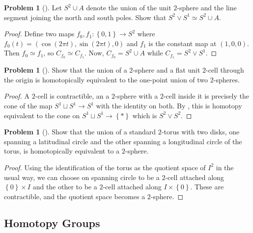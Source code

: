 \documentclass[reqno]{amsart}
\theoremstyle{definition}
\newtheorem{problem}[theorem]{Problem}
\theoremstyle{remark}
\begin{document}
\begin{problem}[]
    \cite[Ex 14.1]{Bredon} Let $S^2 \cup A$ denote the
    union of the unit $2$-sphere and the line segment
    joining the north and south poles. Show that
    $S^2 \vee S^{1} \simeq
    S^2 \cup A$.
\end{problem}

\begin{proof}
    Define two maps
    $f_0,f_1 \colon \left\{ 0,1 \right\}  \to 
    S^2$ where
    $f_0 (t) = \left( \cos (2\pi t), \sin(2\pi t), 0 \right) $ 
    and $f_1$ is the constant map at $(1,0,0)$. Then
    $f_0 \simeq f_1$, so $C_{f_0} \simeq C_{f_1}$. Now,
    $C_{f_0} = S^2 \cup  A$ while
    $C_{f_1} = S^2 \vee S^{1}$.
\end{proof}

\begin{problem}[]
    \cite[Ex 14.2]{Bredon} 
    Show that the union of a $2$-sphere and a flat
    unit  $2$-cell through the origin is homotopically
    equivalent to the one-point union of two $2$-spheres.
\end{problem}

\begin{proof}
    A $2$-cell is contractible, an
    a $2$-sphere with a $2$-cell inside it is precisely the
    cone of the map
    $S^1 \sqcup S^1 \to S^1$ with the identity on both.
    By \cite[Thm 14.19]{Bredon},
    this is homotopy equivalent to the cone on
    $S^1 \sqcup S^1 \to \left\{ * \right\} $ which is
    $S^2 \vee S^2$.
\end{proof}

\begin{problem}[]
    Show that the union of a standard $2$-torus with two disks,
    one spanning a latitudinal circle and the
    other spanning a longitudinal circle of the torus, is
    homotopically equivalent to a $2$-sphere.
\end{problem}

\begin{proof}
     Using the identification of the torus as the
     quotient space of $I^2$ in the usual way, we can choose
     on spanning circle to be a $2$-cell attached
     along $\left\{ 0 \right\} \times I$ and the
     other to be a $2$-cell attached along
     $I \times \left\{ 0 \right\} $. These are contractible, 
     and the quotient space becomes a $2$-sphere.
\end{proof}


\subsection{Homotopy Groups}
\end{document}
